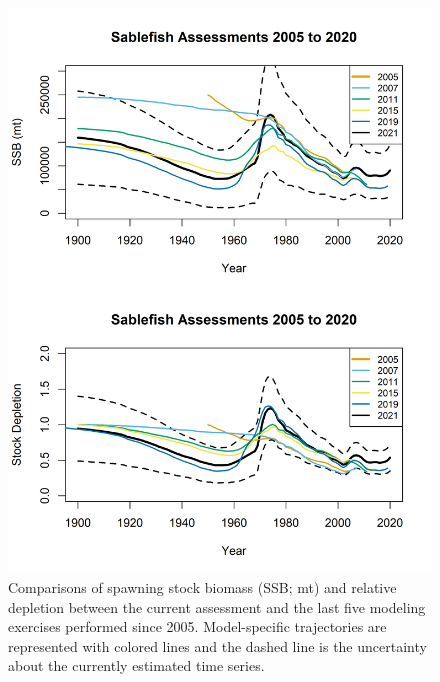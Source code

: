 \documentclass[11pt,
  english,
  a4paper,
]{article}
\begin{document}
\begin{figure}
\centering
\includegraphics[width=1\textwidth,height=0.75\textheight]{figs/HistoricalModelCompare.png}
\caption{Comparisons of spawning stock biomass (SSB; mt) and relative depletion between the current assessment and the last five modeling exercises performed since 2005. Model-specific trajectories are represented with colored lines and the dashed line is the uncertainty about the currently estimated time series.\label{fig:histassess}}
\end{figure}

\tagmcend\tagstructend

\end{document}
